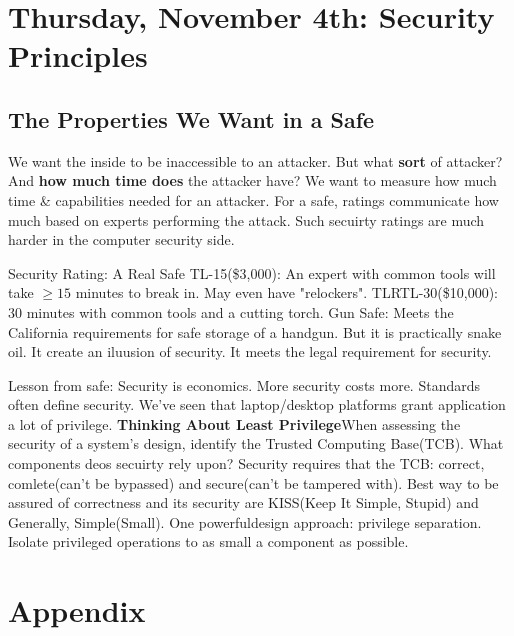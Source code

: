 \documentclass[11 pt]{scrartcl}
\begin{document}
\section{Thursday, November 4th: Security Principles}
\subsection{The Properties We Want in a Safe}
We want the inside to be inaccessible to an attacker. But what \textbf{sort} of attacker? And \textbf{how much time does} the attacker have? We want to measure how much time \& capabilities needed for an attacker. For a safe, ratings communicate how much based on experts performing the attack. Such secuirty ratings are much harder in the computer security side.
\begin{example}
    Security Rating: A Real Safe\newline
    TL-15(\$3,000): An expert with common tools will take $\ge 15$ minutes to break in. May even have "relockers".\newline
    TLRTL-30(\$10,000): 30 minutes with common tools and a cutting torch.\newline
    Gun Safe: Meets the California requirements for safe storage of a handgun. But it is practically snake oil. It create an iluusion of security. It meets the legal requirement for security.
\end{example}
Lesson from safe: Security is economics. More security costs more. Standards often define security.\newline
We've seen that laptop/desktop platforms grant application a lot of privilege. \newline
\textbf{Thinking About Least Privilege}\newline When assessing the security of a system's design, identify the Trusted Computing Base(TCB). What components deos secuirty rely upon? Security requires that the TCB: correct, comlete(can't be bypassed) and secure(can't be tampered with). Best way to be assured of correctness and its security are KISS(Keep It Simple, Stupid) and Generally, Simple(Small). One powerfuldesign approach: privilege separation. Isolate privileged operations to as small a component as possible.
\section{Appendix}
\renewcommand{\listtheoremname}{List of Definitions and Theorems}
\listoftheorems[ignoreall,show={theorem,definition}]

\listoftodos
\end{document}
